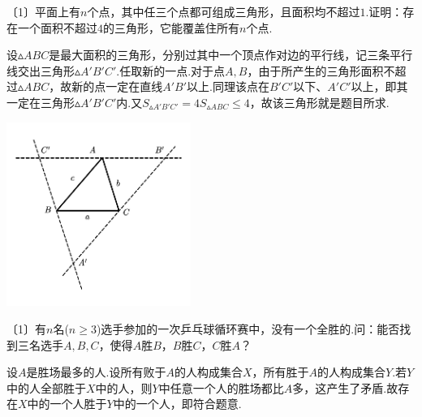 \documentclass[lang=cn, zihao=4.5]{elegantbook}
\newcommand{\nd}[1]{〔#1〕}
\begin{document}
\begin{example} %
	\nd{1}平面上有$n$个点，其中任三个点都可组成三角形，且面积均不超过$1$.证明：存在一个面积不超过$4$的三角形，它能覆盖住所有$n$个点.
\end{example}
\begin{solution}
	设$\vartriangle ABC$是最大面积的三角形，分别过其中一个顶点作对边的平行线，记三条平行线交出三角形$\vartriangle A'B'C'$.任取新的一点.对于点$A,B$，由于所产生的三角形面积不超过$\vartriangle ABC$，故新的点一定在直线$A'B'$以上.同理该点在$B'C'$以下、$A'C'$以上，即其一定在三角形$\vartriangle A'B'C'$内.又$S_{\vartriangle A'B'C'} = 4S_{\vartriangle ABC} \leq 4$，故该三角形就是题目所求.
	\begin{center}
		\includegraphics[width=6cm]{attachment/202302071.pdf}
	\end{center}
\end{solution}

\begin{example} %
	\nd{1}有$n$名($n \geq 3$)选手参加的一次乒乓球循环赛中，没有一个全胜的.问：能否找到三名选手$A,B,C$，使得$A$胜$B$，$B$胜$C$，$C$胜$A$？
\end{example}
\begin{solution}
	设$A$是胜场最多的人.设所有败于$A$的人构成集合$X$，所有胜于$A$的人构成集合$Y$.若$Y$中的人全部胜于$X$中的人，则$Y$中任意一个人的胜场都比$A$多，这产生了矛盾.故存在$X$中的一个人胜于$Y$中的一个人，即符合题意.
\end{solution}
\end{document}
